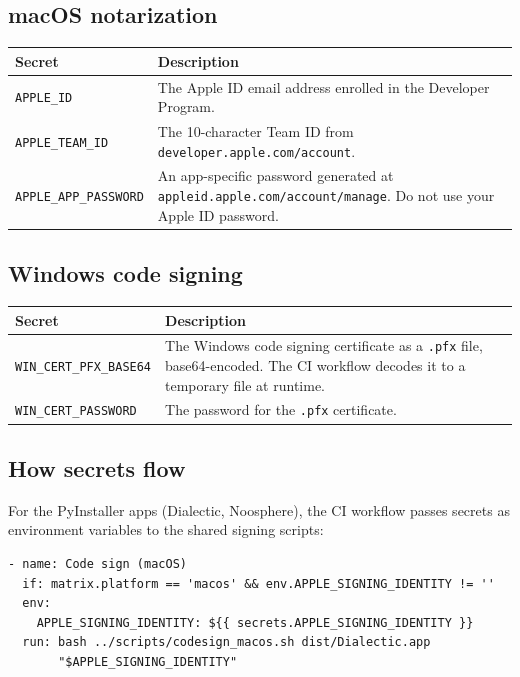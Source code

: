 \documentclass[11pt,letterpaper]{article}
\newcommand{\file}[1]{\texttt{#1}}
\newcommand{\cmd}[1]{\texttt{#1}}
\begin{document}
\subsection{macOS notarization}

\begin{longtable}{p{4cm} p{10.5cm}}
\toprule
\textbf{Secret} & \textbf{Description} \\
\midrule
\endhead
\cmd{APPLE\_ID} & The Apple ID email address enrolled in the Developer Program. \\
\cmd{APPLE\_TEAM\_ID} & The 10-character Team ID from \cmd{developer.apple.com/account}. \\
\cmd{APPLE\_APP\_PASSWORD} & An app-specific password generated at \cmd{appleid.apple.com/account/manage}. Do not use your Apple ID password. \\
\bottomrule
\end{longtable}

\subsection{Windows code signing}

\begin{longtable}{p{4.5cm} p{10cm}}
\toprule
\textbf{Secret} & \textbf{Description} \\
\midrule
\endhead
\cmd{WIN\_CERT\_PFX\_BASE64} & The Windows code signing certificate as a \file{.pfx} file, base64-encoded. The CI workflow decodes it to a temporary file at runtime. \\
\cmd{WIN\_CERT\_PASSWORD} & The password for the \file{.pfx} certificate. \\
\bottomrule
\end{longtable}

\subsection{How secrets flow}

For the PyInstaller apps (Dialectic, Noosphere), the CI workflow passes secrets as environment variables to the shared signing scripts:

\begin{lstlisting}
- name: Code sign (macOS)
  if: matrix.platform == 'macos' && env.APPLE_SIGNING_IDENTITY != ''
  env:
    APPLE_SIGNING_IDENTITY: ${{ secrets.APPLE_SIGNING_IDENTITY }}
  run: bash ../scripts/codesign_macos.sh dist/Dialectic.app
       "$APPLE_SIGNING_IDENTITY"
\end{lstlisting}
\end{document}
